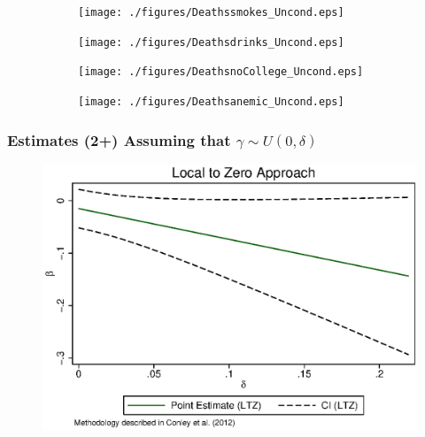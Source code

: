 \documentclass[9pt,letterpaper,subeqn]{beamer}
\begin{document}

\begin{frame}[label=fdgraph]
  \begin{figure}[htpb!]
    \caption{Rates of Miscarriage are higher for twins with unhealthy mothers}
      \begin{subfigure}{.5\textwidth}
      \texttt{[image: ./figures/Deathssmokes\_Uncond.eps]}
    \end{subfigure}%
    \begin{subfigure}{.5\textwidth}
      \texttt{[image: ./figures/Deathsdrinks\_Uncond.eps]}
    \end{subfigure}
    \begin{subfigure}{.5\textwidth}
      \texttt{[image: ./figures/DeathsnoCollege\_Uncond.eps]}
    \end{subfigure}%
    \begin{subfigure}{.5\textwidth}
      \texttt{[image: ./figures/Deathsanemic\_Uncond.eps]}
    \end{subfigure}
    \label{fig:mech}
  \end{figure}
\hyperlink{mech}{}
\end{frame}


\begin{frame}[label=two]
\frametitle{Estimates (2+) Assuming that $\gamma \sim U(0,\delta)$}
\begin{figure}[htpb!]
\centering
  \includegraphics[scale=0.75]{./figures/LTZ_two.eps}
\end{figure}
\hyperlink{Conley}{}
\end{frame}
\end{document}
